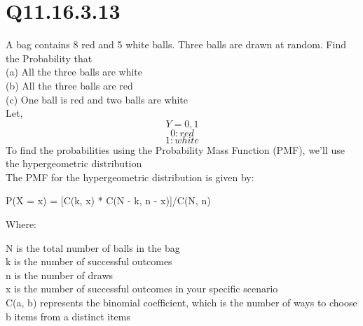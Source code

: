 \documentclass[journal,12pt,twocolumn]{IEEEtran}
\theoremstyle{remark}
\begin{document}
\section{\huge Q11.16.3.13}
\large A bag contains 8 red and 5 white balls. Three balls are drawn at random. Find the
Probability that\\
(a) All the three balls are white\\
(b) All the three balls are red\\
(c) One ball is red and two balls are white\\
\solution
Let, \\
\[Y = {0,1}\]
\[0 : red \]
\[1 : white \]
To find the probabilities using the Probability Mass Function (PMF), we'll use the hypergeometric distribution\\
The PMF for the hypergeometric distribution is given by:

P(X = x) = [C(k, x) * C(N - k, n - x)]/C(N, n)

Where:

    N is the total number of balls in the bag\\
    k is the number of successful outcomes\\
    n is the number of draws\\
    x is the number of successful outcomes in your specific scenario\\
    C(a, b) represents the binomial coefficient, which is the number of ways to choose b items from a distinct items\\
\end{document}
